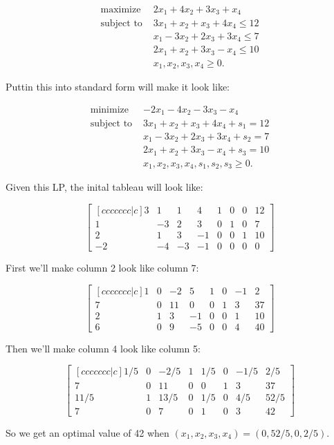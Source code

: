 \documentclass[12pt]{extarticle}
\theoremstyle{definition}
\begin{document}
\begin{problem} 

	\begin{align*}
	\text{maximize } &2x_1+4x_2+3x_3+x_4\\
	\text{subject to } &3x_1+x_2+x_3+4x_4\leq 12\\
	&x_1-3x_2+2x_3+3x_4\leq 7\\
	&2x_1+x_2+3x_3-x_4\leq 10\\
	&x_1, x_2, x_3, x_4\geq 0.
	\end{align*}

	Puttin this into standard form will make it look like:

	\begin{align*}
	\text{minimize } &-2x_1-4x_2-3x_3-x_4\\
	\text{subject to } &3x_1+x_2+x_3+4x_4+s_1 = 12\\
	&x_1-3x_2+2x_3+3x_4+s_2 = 7\\
	&2x_1+x_2+3x_3-x_4+s_3 = 10\\
	&x_1, x_2, x_3, x_4, s_1, s_2, s_3\geq 0.
	\end{align*}

	Given this LP, the inital tableau will look like:

	$$\begin{bmatrix}[ccccccc|c] 3&1&1&4&1&0&0&12\\ 1&-3&2&3&0&1&0&7\\ 2&1&3&-1&0&0&1&10\\ -2&-4&-3&-1&0&0&0&0 \end{bmatrix}$$

	First we'll make column 2 look like column 7:

	$$\begin{bmatrix}[ccccccc|c] 1&0&-2&5&1&0&-1&2\\ 7&0&11&0&0&1&3&37\\ 2&1&3&-1&0&0&1&10\\ 6&0&9&-5&0&0&4&40 \end{bmatrix}$$

	Then we'll make column 4 look like column 5:

	$$\begin{bmatrix}[ccccccc|c] 1/5&0&-2/5&1&1/5&0&-1/5&2/5\\ 7&0&11&0&0&1&3&37\\ 11/5&1&13/5&0&1/5&0&4/5&52/5\\ 7&0&7&0&1&0&3&42 \end{bmatrix}$$

	So we get an optimal value of 42 when $(x_1,x_2,x_3,x_4) = (0,52/5,0,2/5)$.





\end{problem}


\small


\end{document}
